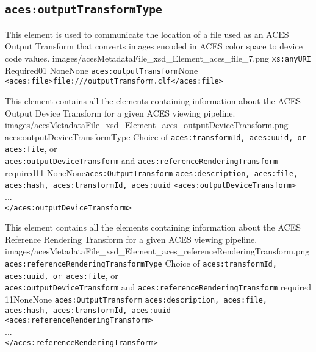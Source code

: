 \subsection{\texttt{aces:outputTransformType}}

		{This element is used to communicate the location of a file used as an ACES Output Transform that converts images encoded in ACES color space to device code values.}
		{images/acesMetadataFile_xsd_Element_aces_file_7.png}
		{\texttt{xs:anyURI}}
		{Required}{0}{1}
		{None}{None}
		{\texttt{aces:outputTransform}}{None}
		{\lstinline{<aces:file>file:///outputTransform.clf</aces:file>}}


        {This element contains all the elements containing information about the ACES Output Device Transform for a given ACES viewing pipeline.}
        {images/acesMetadataFile_xsd_Element_aces_outputDeviceTransform.png}
        {aces:outputDeviceTransformType}
        {Choice of \texttt{aces:transformId, aces:uuid, or aces:file}, or \\
        \texttt{aces:outputDeviceTransform} and \texttt{aces:referenceRenderingTransform} required}{1}{1}
        {None}{None}{\texttt{aces:OutputTransform}}
        {\texttt{aces:description, aces:file, aces:hash, aces:transformId, aces:uuid}}
        {\lstinline{<aces:outputDeviceTransform>} \\
        ... \\
        \lstinline{</aces:outputDeviceTransform>}}
        
        {This element contains all the elements containing information about the ACES Reference Rendering Transform for a given ACES viewing pipeline.}
        {images/acesMetadataFile_xsd_Element_aces_referenceRenderingTransform.png}
        {\texttt{aces:referenceRenderingTransformType}}
        {Choice of \texttt{aces:transformId, aces:uuid, or aces:file}, or \\
        \texttt{aces:outputDeviceTransform} and \texttt{aces:referenceRenderingTransform} required}
        {1}{1}{None}{None}
        {\texttt{aces:OutputTransform}}
        {\texttt{aces:description, aces:file, aces:hash, aces:transformId, aces:uuid}}
        {\lstinline{<aces:referenceRenderingTransform>} \\
        ... \\
        \lstinline{</aces:referenceRenderingTransform>}}
        
